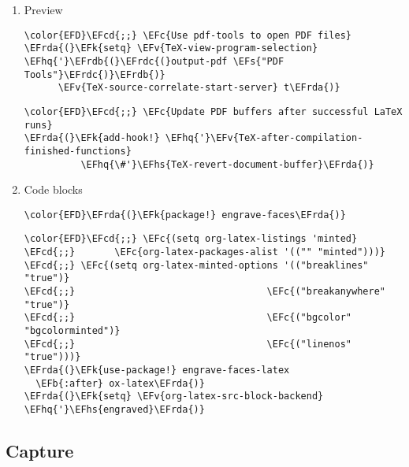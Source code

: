 \documentclass[c]{article}
\theoremstyle{plain}%
\theoremstyle{definition}
\theoremstyle{remark}
\newcommand{\EFc}[1]{\textcolor{EFc}{#1}} %
\newcommand{\EFcd}[1]{\textcolor{EFcd}{#1}} %
\newcommand{\EFs}[1]{\textcolor{EFs}{#1}} %
\newcommand{\EFk}[1]{\textcolor{EFk}{#1}} %
\newcommand{\EFb}[1]{\textcolor{EFb}{#1}} %
\newcommand{\EFv}[1]{\textcolor{EFv}{#1}} %
\newcommand{\EFhq}[1]{\textcolor{EFhq}{#1}} %
\newcommand{\EFhs}[1]{\textcolor{EFhs}{#1}} %
\newcommand{\EFrda}[1]{\textcolor{EFrda}{#1}} %
\newcommand{\EFrdb}[1]{\textcolor{EFrdb}{#1}} %
\newcommand{\EFrdc}[1]{\textcolor{EFrdc}{#1}} %
\begin{document}
\begin{enumerate}
\item Preview
\label{sec:org402cd5f}
\begin{Code}
\begin{Verbatim}
\color{EFD}\EFcd{;;} \EFc{Use pdf-tools to open PDF files}
\EFrda{(}\EFk{setq} \EFv{TeX-view-program-selection} \EFhq{'}\EFrdb{(}\EFrdc{(}output-pdf \EFs{"PDF Tools"}\EFrdc{)}\EFrdb{)}
      \EFv{TeX-source-correlate-start-server} t\EFrda{)}
\end{Verbatim}
\end{Code}
\begin{Code}
\begin{Verbatim}
\color{EFD}\EFcd{;;} \EFc{Update PDF buffers after successful LaTeX runs}
\EFrda{(}\EFk{add-hook!} \EFhq{'}\EFv{TeX-after-compilation-finished-functions}
          \EFhq{\#'}\EFhs{TeX-revert-document-buffer}\EFrda{)}
\end{Verbatim}
\end{Code}
\item Code blocks
\label{sec:orgdcae980}
\begin{Code}
\begin{Verbatim}
\color{EFD}\EFrda{(}\EFk{package!} engrave-faces\EFrda{)}
\end{Verbatim}
\end{Code}
\begin{Code}
\begin{Verbatim}
\color{EFD}\EFcd{;;} \EFc{(setq org-latex-listings 'minted}
\EFcd{;;}       \EFc{org-latex-packages-alist '(("" "minted")))}
\EFcd{;;} \EFc{(setq org-latex-minted-options '(("breaklines" "true")}
\EFcd{;;}                                  \EFc{("breakanywhere" "true")}
\EFcd{;;}                                  \EFc{("bgcolor" "bgcolorminted")}
\EFcd{;;}                                  \EFc{("linenos" "true")))}
\EFrda{(}\EFk{use-package!} engrave-faces-latex
  \EFb{:after} ox-latex\EFrda{)}
\EFrda{(}\EFk{setq} \EFv{org-latex-src-block-backend} \EFhq{'}\EFhs{engraved}\EFrda{)}
\end{Verbatim}
\end{Code}
\end{enumerate}
\subsection{Capture}
\label{sec:org1e30bce}
\end{document}

